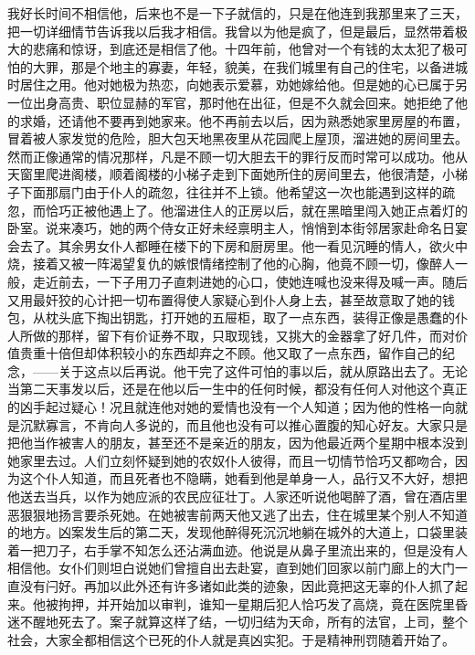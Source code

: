 \par 我好长时间不相信他，后来也不是一下子就信的，只是在他连到我那里来了三天，把一切详细情节告诉我以后我才相信。我曾以为他是疯了，但是最后，显然带着极大的悲痛和惊讶，到底还是相信了他。十四年前，他曾对一个有钱的太太犯了极可怕的大罪，那是个地主的寡妻，年轻，貌美，在我们城里有自己的住宅，以备进城时居住之用。他对她极为热恋，向她表示爱慕，劝她嫁给他。但是她的心已属于另一位出身高贵、职位显赫的军官，那时他在出征，但是不久就会回来。她拒绝了他的求婚，还请他不要再到她家来。他不再前去以后，因为熟悉她家里房屋的布置，冒着被人家发觉的危险，胆大包天地黑夜里从花园爬上屋顶，溜进她的房间里去。然而正像通常的情况那样，凡是不顾一切大胆去干的罪行反而时常可以成功。他从天窗里爬进阁楼，顺着阁楼的小梯子走到下面她所住的房间里去，他很清楚，小梯子下面那扇门由于仆人的疏忽，往往并不上锁。他希望这一次也能遇到这样的疏忽，而恰巧正被他遇上了。他溜进住人的正房以后，就在黑暗里闯入她正点着灯的卧室。说来凑巧，她的两个侍女正好未经禀明主人，悄悄到本街邻居家赴命名日宴会去了。其余男女仆人都睡在楼下的下房和厨房里。他一看见沉睡的情人，欲火中烧，接着又被一阵渴望复仇的嫉恨情绪控制了他的心胸，他竟不顾一切，像醉人一般，走近前去，一下子用刀子直刺进她的心口，使她连喊也没来得及喊一声。随后又用最奸狡的心计把一切布置得使人家疑心到仆人身上去，甚至故意取了她的钱包，从枕头底下掏出钥匙，打开她的五屉柜，取了一点东西，装得正像是愚蠢的仆人所做的那样，留下有价证券不取，只取现钱，又挑大的金器拿了好几件，而对价值贵重十倍但却体积较小的东西却弃之不顾。他又取了一点东西，留作自己的纪念，——关于这点以后再说。他干完了这件可怕的事以后，就从原路出去了。无论当第二天事发以后，还是在他以后一生中的任何时候，都没有任何人对他这个真正的凶手起过疑心！况且就连他对她的爱情也没有一个人知道；因为他的性格一向就是沉默寡言，不肯向人多说的，而且他也没有可以推心置腹的知心好友。大家只是把他当作被害人的朋友，甚至还不是亲近的朋友，因为他最近两个星期中根本没到她家里去过。人们立刻怀疑到她的农奴仆人彼得，而且一切情节恰巧又都吻合，因为这个仆人知道，而且死者也不隐瞒，她看到他是单身一人，品行又不大好，想把他送去当兵，以作为她应派的农民应征壮丁。人家还听说他喝醉了酒，曾在酒店里恶狠狠地扬言要杀死她。在她被害前两天他又逃了出去，住在城里某个别人不知道的地方。凶案发生后的第二天，发现他醉得死沉沉地躺在城外的大道上，口袋里装着一把刀子，右手掌不知怎么还沾满血迹。他说是从鼻子里流出来的，但是没有人相信他。女仆们则坦白说她们曾擅自出去赴宴，直到她们回家以前门廊上的大门一直没有闩好。再加以此外还有许多诸如此类的迹象，因此竟把这无辜的仆人抓了起来。他被拘押，并开始加以审判，谁知一星期后犯人恰巧发了高烧，竟在医院里昏迷不醒地死去了。案子就算这样了结，一切归结为天命，所有的法官，上司，整个社会，大家全都相信这个已死的仆人就是真凶实犯。于是精神刑罚随着开始了。
